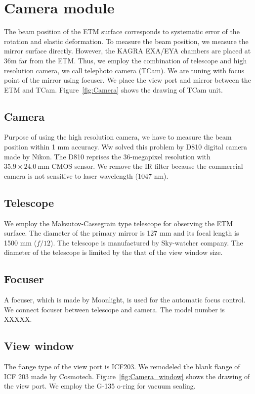 
\section{Camera module}
The beam position of the ETM surface corresponds to systematic error of the rotation and elastic deformation. To measure the beam position, we measure the mirror surface directly. However, the KAGRA EXA/EYA chambers are placed at 36m far from the ETM. Thus, we employ the combination of telescope and high resolution camera, we call telephoto camera (TCam). We are tuning with focus point of the mirror using focuser.  We place the view port and mirror between the ETM and TCam. Figure~\ref{fig:Camera} shows the drawing of TCam unit.
\subsection{Camera}
Purpose of using the high resolution camera, we have to measure the beam position within 1 mm accuracy. Ww solved this problem by D810 digital camera made by Nikon. The D810 reprises the 36-megapixel resolution with $35.9 \times 24.0~\mathrm{mm}$ CMOS sensor. We remove the IR filter because the commercial camera is not sensitive to laser wavelength (1047 nm).
\subsection{Telescope}
We employ the Maksutov-Cassegrain type telescope for observing the ETM surface. The diameter of the primary mirror is 127 mm and its focal length is 1500 mm ($f/12$). The telescope is manufactured by Sky-watcher company. The diameter of the telescope is limited by the that of the view window size. 
\subsection{Focuser}
A focuser, which is made by Moonlight, is used for the automatic focus control. 
We connect focuser between telescope and camera. The model number is XXXXX.
\subsection{View window}
The flange type of the view port is ICF203. We remodeled the blank flange of ICF 203 made by Cosmotech. Figure~\ref{fig:Camera_window} shows the drawing of the view port. We employ the G-135 o-ring for vacuum sealing. 

